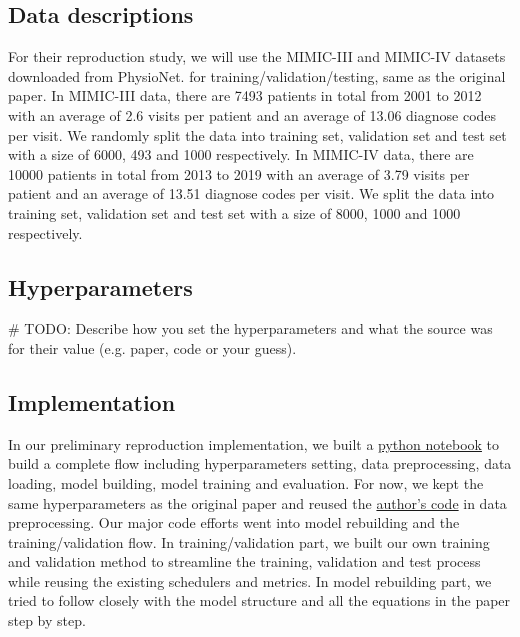 \documentclass[11pt,a4paper]{article}
\begin{document}
\subsection{Data descriptions}
For their reproduction study, we will use the MIMIC-III \cite{mimic3} and MIMIC-IV
\cite{mimic4} datasets downloaded from PhysioNet\cite{physionet}. for training/validation/testing, same as the original paper. In MIMIC-III data, there are 7493 patients in total from 2001 to 2012 with an average of 2.6 visits per patient and an average of 13.06 diagnose codes per visit. We randomly split the data into training set, validation set and test set with a size of 6000, 493 and 1000 respectively. In MIMIC-IV data, there are 10000 patients in total from 2013 to 2019 with an average of 3.79 visits per patient and an average of 13.51 diagnose codes per visit. We split the data into training set, validation set and test set with a size of 8000, 1000 and 1000 respectively. 

\subsection{Hyperparameters}
\# TODO:
Describe how you set the hyperparameters and what the source was for their value (e.g. paper, code or your guess). 

\subsection{Implementation}
In our preliminary reproduction implementation, we built a \href{https://github.com/willtsai/dlh-sp23-team53/blob/main/notebook.ipynb}{python notebook} to build a complete flow including hyperparameters setting, 
data preprocessing, data loading, model building, model training and evaluation. For now, we kept the same hyperparameters as the original paper and reused the \href{https://github.com/LuChang-CS/Chet}{author's code} in data preprocessing.
Our major code efforts went into model rebuilding and the training/validation flow. In training/validation part, we built our own training and validation method to streamline the training, validation and test process while reusing the existing 
schedulers and metrics. In model rebuilding part, we tried to follow closely with the model structure and all the equations in the paper step by step.
\end{document}
